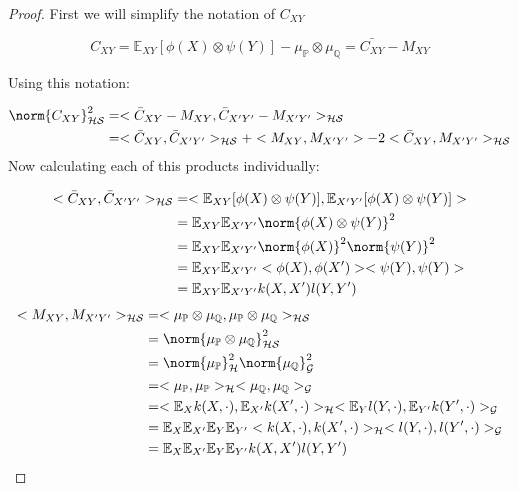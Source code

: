 \begin{proof}


First we will simplify the notation of $C_{XY}$

\vspace{5mm}
$$ C_{XY} = \mathbb{E}_{XY}[\phi(X) \otimes \psi(Y)] - \mu_{\mathbb{P}} \otimes \mu_{\mathbb{Q}} = \bar{C_{XY}} - M_{XY}$$

Using this notation:

\begin{equation}{}
\begin{split}
\norm{C_{XY}}^{2}_{\mathcal{HS}}
& = <\bar{C}_{XY} - M_{XY},\bar{C}_{X'Y'} - M_{X'Y'}>_{\mathcal{HS}} \\
& = <\bar{C}_{XY},\bar{C}_{X'Y'}>_{\mathcal{HS}}+< M_{XY}, M_{X'Y'}>-2<\bar{C}_{XY}, M_{X'Y'}>_{\mathcal{HS}}
\end{split}
\end{equation}
Now calculating each of this products individually:

\begin{equation}{}
\begin{split}
<\bar{C}_{XY},\bar{C}_{X'Y'}>_{\mathcal{HS}} 
& = <\mathbb{E}_{XY}[\phi(X) \otimes \psi(Y)],\mathbb{E}_{X'Y'}[\phi(X) \otimes \psi(Y)] >\\
& = \mathbb{E}_{XY}\mathbb{E}_{X'Y'}\norm{\phi(X) \otimes \psi(Y)}^{2} \\
& = \mathbb{E}_{XY}\mathbb{E}_{X'Y'}\norm{\phi(X)}^{2}\norm{\psi(Y)}^{2}\\
& = \mathbb{E}_{XY}\mathbb{E}_{X'Y'}<\phi(X),\phi(X')><\psi(Y),\psi(Y)> \\
& = \mathbb{E}_{XY}\mathbb{E}_{X'Y'} k(X,X')l(Y,Y') \\
\end{split}
\end{equation}
\begin{equation}{}
\begin{split}
<M_{XY},M_{X'Y'}>_{\mathcal{HS}}
& = <\mu_{\mathbb{P}}\otimes\mu_{\mathbb{Q}},\mu_{\mathbb{P}}\otimes\mu_{\mathbb{Q}}>_{\mathcal{HS}} \\
& = \norm{\mu_{\mathbb{P}}\otimes\mu_{\mathbb{Q}}}^{2}_{\mathcal{HS}} \\
& = \norm{\mu_{\mathbb{P}}}^{2}_{\mathcal{H}}\norm{\mu_{\mathbb{Q}}}^{2}_{\mathcal{G}} \\
& = <\mu_{\mathbb{P}},\mu_{\mathbb{P}}>_{\mathcal{H}}<\mu_{\mathbb{Q}},\mu_{\mathbb{Q}}>_{\mathcal{G}} \\
& = <\mathbb{E}_{X}k(X,\cdot),\mathbb{E}_{X'}k(X',\cdot)>_{\mathcal{H}}<\mathbb{E}_{Y}l(Y,\cdot),\mathbb{E}_{Y'}k(Y',\cdot)>_{\mathcal{G}} \\
& = \mathbb{E}_{X}\mathbb{E}_{X'}\mathbb{E}_{Y}\mathbb{E}_{Y'}<k(X,\cdot),k(X',\cdot)>_{\mathcal{H}}<l(Y,\cdot),l(Y',\cdot)>_{\mathcal{G}} \\
& = \mathbb{E}_{X}\mathbb{E}_{X'}\mathbb{E}_{Y}\mathbb{E}_{Y'}k(X,X')l(Y,Y') \\
\end{split}
\end{equation}


\end{proof}
